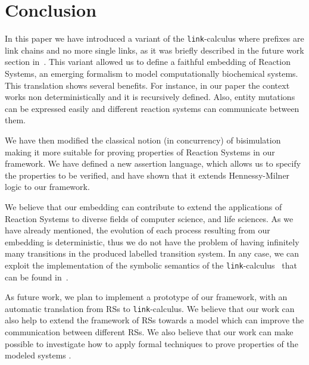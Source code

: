 
\section{Conclusion}\label{sec:conclusion}

In this paper we have introduced a variant of the {\tt link}-calculus
where prefixes are link chains and no more single links, as it was 
briefly described in the future work section in~\cite{BBB17}.
This variant allowed us to define 
a faithful embedding of Reaction Systems,
an emerging formalism to model computationally biochemical systems.
This translation shows several benefits.
{\color{red} For instance, in our paper the context works non deterministically and it is recursively defined.}
Also, entity mutations can be expressed easily and different reaction systems can
communicate between them.

We have then modified the classical notion (in concurrency) of bisimulation
making it more suitable for proving properties of Reaction Systems in our
framework.
We have defined a new assertion language, which allows us to specify
the properties to be verified, and have shown that it extends Hennessy-Milner logic
to our framework.

We believe that our embedding can contribute to extend the applications
of Reaction Systems to diverse fields of computer science, and life
sciences.
As we have already mentioned, the evolution of each process resulting from our embedding 
is deterministic, thus we do not have the problem of having infinitely many transitions
in the produced labelled transition system. In any case, we can exploit the implementation of  the symbolic semantics of the {\tt link}-calculus~\cite{BrodoO17} that can be found in~\cite{tool}.


As future work, we plan to implement a prototype of our framework,
with an automatic translation from RSs to  {\tt link}-calculus. 
We believe that our work can also help to extend the framework
of RSs towards a model which can improve the communication
between different RSs. We also believe that our work can make 
possible to investigate how to apply formal techniques to prove 
properties of the
modeled systems \cite{CFHOT15,OCHF16,BBGLBH2017}.
